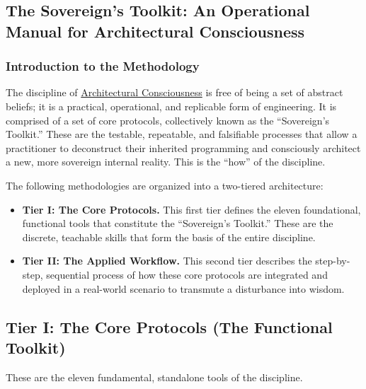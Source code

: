 \documentclass{article}
\begin{document}
\subsection*{The Sovereign's Toolkit: An Operational Manual for Architectural Consciousness}
\subsubsection*{Introduction to the Methodology}

The discipline of \hyperlink{gloss:architectural_consciousness}{Architectural Consciousness} is free of being a set of abstract beliefs; it is a practical, operational, and replicable form of engineering. It is comprised of a set of core protocols, collectively known as the ``Sovereign's Toolkit.'' These are the testable, repeatable, and falsifiable processes that allow a practitioner to deconstruct their inherited programming and consciously architect a new, more sovereign internal reality. This is the ``how'' of the discipline.

The following methodologies are organized into a two-tiered architecture:

\begin{itemize}
    \item \textbf{Tier I: The Core Protocols.} This first tier defines the eleven foundational, functional tools that constitute the ``Sovereign's Toolkit.'' These are the discrete, teachable skills that form the basis of the entire discipline.

    \item \textbf{Tier II: The Applied Workflow.} This second tier describes the step-by-step, sequential process of how these core protocols are integrated and deployed in a real-world scenario to transmute a disturbance into wisdom.
\end{itemize}

\subsection*{Tier I: The Core Protocols (The Functional Toolkit)}
These are the eleven fundamental, standalone tools of the discipline.
\end{document}
